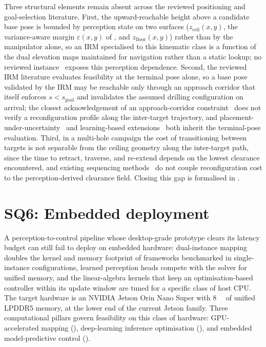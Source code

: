 \documentclass[11pt,a4paper]{article}
\begin{document}
Three structural elements remain absent across the reviewed positioning and goal-selection literature. First, the upward-reachable height above a candidate base pose is bounded by perception state on two surfaces ($z_{\text{ceil}}(x,y)$, the variance-aware margin $\varepsilon(x,y)$ of , and $z_{\text{floor}}(x,y)$) rather than by the manipulator alone, so an IRM specialised to this kinematic class is a function of the dual elevation maps maintained for navigation rather than a static lookup; no reviewed instance~\citep{RobotPlacementBased,makhalReuleauxRobotBase2017,rudorferRM4DCombinedReachability2024,qiu2025fruitirm} exposes this perception dependence. Second, the reviewed IRM literature evaluates feasibility at the terminal pose alone, so a base pose validated by the IRM may be reachable only through an approach corridor that itself enforces $s < s_{\text{goal}}$ and invalidates the assumed drilling configuration on arrival; the closest acknowledgement of an approach-corridor constraint~\citep{zhu2025bricklaying} does not verify a reconfiguration profile along the inter-target trajectory, and placement-under-uncertainty~\citep{xu2020planning,gautierOptimizingRobotPositioning2025} and learning-based extensions~\citep{jauhriRobotLearningMobile2022,naik2024basenet,fengPredictiveReachabilityEmbodiment2024} both inherit the terminal-pose evaluation. Third, in a multi-hole campaign the cost of transitioning between targets is not separable from the ceiling geometry along the inter-target path, since the time to retract, traverse, and re-extend depends on the lowest clearance encountered, and existing sequencing methods~\citep{nguyenTaskSpaceClusteringMobile2023,reisterCombiningNavigationManipulation2022} do not couple reconfiguration cost to the perception-derived clearance field. Closing this gap is formalised in .

\section{SQ6: Embedded deployment}
\label{sec:sq6}

A perception-to-control pipeline whose desktop-grade prototype clears its latency budget can still fail to deploy on embedded hardware: dual-instance mapping doubles the kernel and memory footprint of frameworks benchmarked in single-instance configurations, learned perception heads compete with the solver for unified memory, and the linear-algebra kernels that keep an optimisation-based controller within its update window are tuned for a specific class of host CPU. The target hardware is an NVIDIA Jetson Orin Nano Super with \SI{8}{\giga\byte} of unified LPDDR5 memory, at the lower end of the current Jetson family. Three computational pillars govern feasibility on this class of hardware: GPU-accelerated mapping (), deep-learning inference optimisation (), and embedded model-predictive control ().
\end{document}
